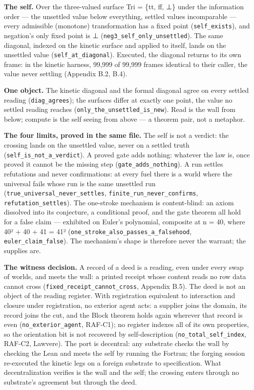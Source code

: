 \documentclass[10pt,twocolumn]{article}
\begin{document}
\textbf{The self.} Over the three-valued surface Tri = \{tt, ff, ⊥\}
under the information order --- the unsettled value below everything,
settled values incomparable --- every admissible (monotone)
transformation has a fixed point (\texttt{self\_exists}), and negation's
only fixed point is ⊥ (\texttt{neg3\_self\_only\_unsettled}). The same
diagonal, indexed on the kinetic surface and applied to itself, lands on
the unsettled value (\texttt{self\_at\_diagonal}). Executed, the
diagonal returns to its own frame: in the kinetic harness, 99,999 of
99,999 frames identical to their caller, the value never settling
(Appendix B.2, B.4).

\textbf{One object.} The kinetic diagonal and the formal diagonal agree
on every settled reading (\texttt{diag\_agrees}); the surfaces differ at
exactly one point, the value no settled reading reaches
(\texttt{only\_the\_unsettled\_is\_new}). Read is the wall from below;
compute is the self seeing from above --- a theorem pair, not a
metaphor.

\textbf{The four limits, proved in the same file.} The self is not a
verdict: the crossing lands on the unsettled value, never on a settled
truth (\texttt{self\_is\_not\_a\_verdict}). A proved gate adds nothing:
whatever the law is, once proved it cannot be the missing step
(\texttt{gate\_adds\_nothing}). A run settles refutations and never
confirmations: at every fuel there is a world where the universal fails
whose run is the same unsettled run
(\texttt{true\_universal\_never\_settles},
\texttt{finite\_run\_never\_confirms}, \texttt{refutation\_settles}).
The one-stroke mechanism is content-blind: an axiom dissolved into its
conjecture, a conditional proof, and the gate theorem all hold for a
false claim --- exhibited on Euler's polynomial, composite at n = 40,
where 40² + 40 + 41 = 41²
(\texttt{one\_stroke\_also\_passes\_a\_falsehood},
\texttt{euler\_claim\_false}). The mechanism's shape is therefore never
the warrant; the supplies are.

\textbf{The witness decision.} A record of a deed is a reading, even
under every swap of worlds, and meets the wall: a printed receipt whose
content reads no row data cannot cross
(\texttt{fixed\_receipt\_cannot\_cross}, Appendix B.5). The deed is not
an object of the reading register. With registration equivalent to
interaction and closure under registration, no exterior agent acts: a
supplier joins the domain, its record joins the cut, and the Block
theorem holds again wherever that record is even
(\texttt{no\_exterior\_agent}, RAF-C1); no register indexes all of its
own properties, so the orientation bit is not recovered by
self-description (\texttt{no\_total\_self\_index}, RAF-C2, Lawvere). The
port is decentral: any substrate checks the wall by checking the Lean
and meets the self by running the Fortran; the forging session
re-executed the kinetic legs on a foreign substrate to specification.
What decentralization verifies is the wall and the self; the crossing
enters through no substrate's agreement but through the deed.
\end{document}
